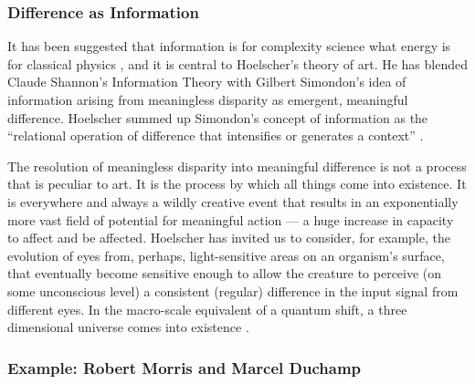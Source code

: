 \documentclass[letterpaper]{article}
\begin{document}

    \subsubsection{Difference as Information}

    It has been suggested that information is for complexity science what energy is for classical physics \citep[0:52]{CrutchfieldIntrdctnToCmplxty2018} \citep{CrutfieldRtAlSgntrsOfInfnty2015}, and it is central to Hoelscher's theory of art. He has blended Claude Shannon's Information Theory with Gilbert Simondon's idea of information arising from meaningless disparity as emergent, meaningful difference. Hoelscher summed up Simondon's concept of information as the “relational operation of difference that intensifies or generates a context” \citep[p.6]{HoelscherArtAsInfrmtn2021}.
    
    The resolution of meaningless disparity into meaningful difference is not a process that is peculiar to art. It is the process by which all things come into existence. It is everywhere and always a wildly creative event that results in an exponentially more vast field of potential for meaningful action — a huge increase in capacity to affect and be affected. Hoelscher has invited us to consider, for example, the evolution of eyes from, perhaps, light-sensitive areas on an organism's surface, that eventually become sensitive enough to allow the creature to perceive (on some unconscious level) a consistent (regular) difference in the input signal from different eyes. In the macro-scale equivalent of a quantum shift, a three dimensional universe comes into existence \citep[p.5]{HoelscherArtAsInfrmtn2021}.

    \subsubsection{Example: Robert Morris and Marcel Duchamp}
\end{document}
